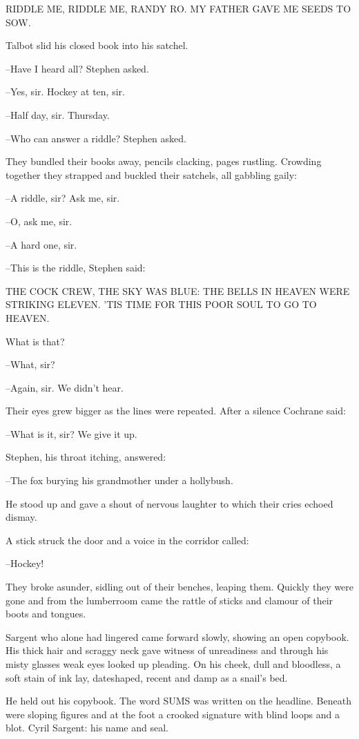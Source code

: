     RIDDLE ME, RIDDLE ME, RANDY RO.
    MY FATHER GAVE ME SEEDS TO SOW.


Talbot slid his closed book into his satchel.

--Have I heard all? Stephen asked.

--Yes, sir. Hockey at ten, sir.

--Half day, sir. Thursday.

--Who can answer a riddle? Stephen asked.

They bundled their books away, pencils clacking, pages rustling.
Crowding together they strapped and buckled their satchels, all gabbling
gaily:

--A riddle, sir? Ask me, sir.

--O, ask me, sir.

--A hard one, sir.

--This is the riddle, Stephen said:


    THE COCK CREW,
    THE SKY WAS BLUE:
    THE BELLS IN HEAVEN
    WERE STRIKING ELEVEN.
    'TIS TIME FOR THIS POOR SOUL
    TO GO TO HEAVEN.


What is that?

--What, sir?

--Again, sir. We didn't hear.

Their eyes grew bigger as the lines were repeated. After a silence
Cochrane said:

--What is it, sir? We give it up.

Stephen, his throat itching, answered:

--The fox burying his grandmother under a hollybush.

He stood up and gave a shout of nervous laughter to which their cries
echoed dismay.

A stick struck the door and a voice in the corridor called:

--Hockey!

They broke asunder, sidling out of their benches, leaping them.
Quickly they were gone and from the lumberroom came the rattle of sticks
and clamour of their boots and tongues.

Sargent who alone had lingered came forward slowly, showing an
open copybook. His thick hair and scraggy neck gave witness of
unreadiness and through his misty glasses weak eyes looked up pleading.
On his cheek, dull and bloodless, a soft stain of ink lay, dateshaped,
recent and damp as a snail's bed.

He held out his copybook. The word SUMS was written on the
headline. Beneath were sloping figures and at the foot a crooked signature
with blind loops and a blot. Cyril Sargent: his name and seal.

